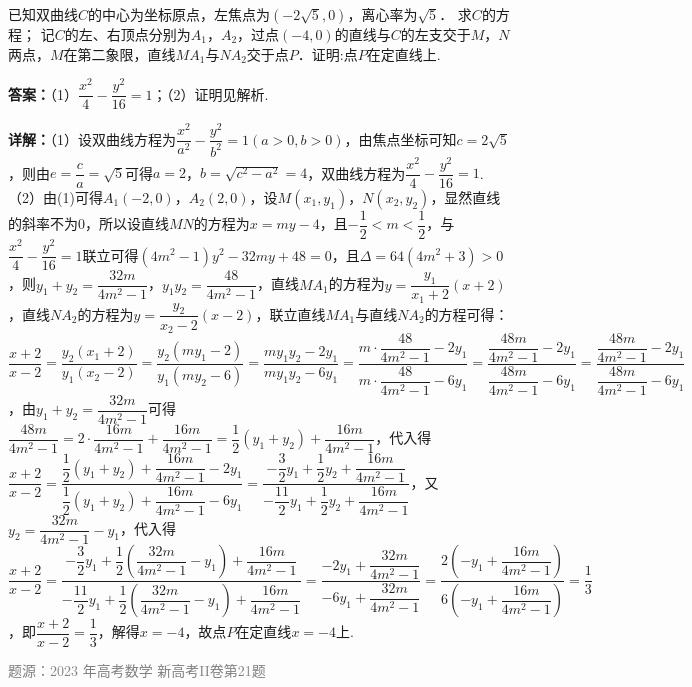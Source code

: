 \begin{question}
已知双曲线$C$的中心为坐标原点，左焦点为$(-2\sqrt{5},0)$，离心率为$\sqrt{5}$．
求$C$的方程；
记$C$的左、右顶点分别为$A_{1}$，$A_{2}$，过点$(-4,0)$的直线与$C$的左支交于$M$，$N$两点，$M$在第二象限，直线$MA_{1}$与$NA_{2}$交于点$P$．证明:点$P$在定直线上.
\begin{solution}
\textbf{答案：}（1）$\dfrac{x^{2}}{4}-\dfrac{y^{2}}{16}=1$；（2）证明见解析.

\textbf{详解：}（1）设双曲线方程为$\dfrac{x^{2}}{a^{2}}-\dfrac{y^{2}}{b^{2}}=1(a>0,b>0)$，由焦点坐标可知$c=2\sqrt{5}$，则由$e=\dfrac{c}{a}=\sqrt{5}$可得$a=2$，$b=\sqrt{c^{2}-a^{2}}=4$，双曲线方程为$\dfrac{x^{2}}{4}-\dfrac{y^{2}}{16}=1$.
（2）由(1)可得$A_{1}(-2,0)$，$A_{2}(2,0)$，设$M(x_{1},y_{1})$，$N(x_{2},y_{2})$，显然直线的斜率不为$0$，所以设直线$MN$的方程为$x=my-4$，且$-\dfrac{1}{2}<m<\dfrac{1}{2}$，与$\dfrac{x^{2}}{4}-\dfrac{y^{2}}{16}=1$联立可得$(4m^{2}-1)y^{2}-32my+48=0$，且$\Delta=64(4m^{2}+3)>0$，则$y_{1}+y_{2}=\dfrac{32m}{4m^{2}-1}$，$y_{1}y_{2}=\dfrac{48}{4m^{2}-1}$，直线$MA_{1}$的方程为$y=\dfrac{y_{1}}{x_{1}+2}(x+2)$，直线$NA_{2}$的方程为$y=\dfrac{y_{2}}{x_{2}-2}(x-2)$，联立直线$MA_{1}$与直线$NA_{2}$的方程可得：$\dfrac{x+2}{x-2}=\dfrac{y_{2}(x_{1}+2)}{y_{1}(x_{2}-2)}=\dfrac{y_{2}(my_{1}-2)}{y_{1}(my_{2}-6)}=\dfrac{my_{1}y_{2}-2y_{1}}{my_{1}y_{2}-6y_{1}}=\dfrac{m\cdot\dfrac{48}{4m^{2}-1}-2y_{1}}{m\cdot\dfrac{48}{4m^{2}-1}-6y_{1}}=\dfrac{\dfrac{48m}{4m^{2}-1}-2y_{1}}{\dfrac{48m}{4m^{2}-1}-6y_{1}}=\dfrac{\dfrac{48m}{4m^{2}-1}-2y_{1}}{\dfrac{48m}{4m^{2}-1}-6y_{1}}$，由$y_{1}+y_{2}=\dfrac{32m}{4m^{2}-1}$可得$\dfrac{48m}{4m^{2}-1}=2\cdot\dfrac{16m}{4m^{2}-1}+\dfrac{16m}{4m^{2}-1}=\dfrac{1}{2}(y_{1}+y_{2})+\dfrac{16m}{4m^{2}-1}$，代入得$\dfrac{x+2}{x-2}=\dfrac{\dfrac{1}{2}(y_{1}+y_{2})+\dfrac{16m}{4m^{2}-1}-2y_{1}}{\dfrac{1}{2}(y_{1}+y_{2})+\dfrac{16m}{4m^{2}-1}-6y_{1}}=\dfrac{-\dfrac{3}{2}y_{1}+\dfrac{1}{2}y_{2}+\dfrac{16m}{4m^{2}-1}}{-\dfrac{11}{2}y_{1}+\dfrac{1}{2}y_{2}+\dfrac{16m}{4m^{2}-1}}$，又$y_{2}=\dfrac{32m}{4m^{2}-1}-y_{1}$，代入得$\dfrac{x+2}{x-2}=\dfrac{-\dfrac{3}{2}y_{1}+\dfrac{1}{2}(\dfrac{32m}{4m^{2}-1}-y_{1})+\dfrac{16m}{4m^{2}-1}}{-\dfrac{11}{2}y_{1}+\dfrac{1}{2}(\dfrac{32m}{4m^{2}-1}-y_{1})+\dfrac{16m}{4m^{2}-1}}=\dfrac{-2y_{1}+\dfrac{32m}{4m^{2}-1}}{-6y_{1}+\dfrac{32m}{4m^{2}-1}}=\dfrac{2(-y_{1}+\dfrac{16m}{4m^{2}-1})}{6(-y_{1}+\dfrac{16m}{4m^{2}-1})}=\dfrac{1}{3}$，即$\dfrac{x+2}{x-2}=\dfrac{1}{3}$，解得$x=-4$，故点$P$在定直线$x=-4$上.

\textcolor{gray}{\footnotesize 题源：2023 年高考数学 新高考II卷第21题}
\end{solution}
\end{question}

